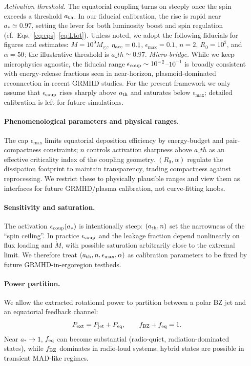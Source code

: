\documentclass[twocolumn]{aastex701}
\newcommand{\ath}{a_{\rm th}}
\newcommand{\rg}{r_g}
\newcommand{\LEdd}{L_{\rm Edd}}
\newcommand{\Ltot}{L_{\rm tot}}
\newcommand{\FeKa}{\mathrm{Fe\,K}\alpha}
\def\ath{a\_th}\def\rg{r\_g}\def\LEdd{L\_Edd}\def\Ltot{L\_tot}\def\FeKa{Fe K\string\alpha}%
\begin{document}
\noindent\textit{Activation threshold.}
The equatorial coupling turns on steeply once the spin exceeds a threshold \(a_{\rm th}\).
In our fiducial calibration, the rise is rapid near \(a_\ast \simeq 0.97\), setting the lever for both luminosity boost and spin regulation (cf.\ Eqs.~\eqref{eq:eps}--\eqref{eq:Ltot}).
\FloatBarrier
Unless noted, we adopt the following fiducials for figures and estimates: $M=10^9M_\odot$, $\eta_{\rm acc}=0.1$, $\epsilon_{\max}=0.1$, $n=2$, $R_0=10^2$, and $\alpha=50$; the illustrative threshold is $\ath\simeq0.97$.
\noindent\emph{Micro-bridge.}
While we keep microphysics agnostic, the fiducial range
$\epsilon_{\rm coup}\sim10^{-2}$–$10^{-1}$ is broadly consistent with
energy-release fractions seen in near-horizon, plasmoid-dominated
reconnection in recent GRMHD studies. For the present framework we only
assume that $\epsilon_{\rm coup}$ rises sharply above $a_{\rm th}$ and
saturates below $\epsilon_{\max}$; detailed calibration is left for
future simulations.

\paragraph{Phenomenological parameters and physical ranges.}
The cap $\epsilon_{\max}$ limits equatorial deposition efficiency by energy-budget and pair-compactness constraints; $n$ controls activation sharpness above $\ath$ as an effective criticality index of the coupling geometry. $(R_0,\alpha)$ regulate the dissipation footprint to maintain transparency, trading compactness against reprocessing. We restrict these to physically plausible ranges and view them as interfaces for future GRMHD/plasma calibration, not curve-fitting knobs.
\paragraph{Sensitivity and saturation.}
The activation $\epsilon_{\rm coup}(a_*)$ is intentionally steep: $(a_{\rm th},n)$ set the narrowness of the “spin ceiling”. In practice $\epsilon_{\rm coup}$ and the leakage fraction depend nonlinearly on flux loading and $\dot M$, with possible saturation arbitrarily close to the extremal limit. We therefore treat $(a_{\rm th},n,\epsilon_{\max},\alpha)$ as calibration parameters to be fixed by future GRMHD-in-ergoregion testbeds.


\paragraph{Power partition.}
We allow the extracted rotational power to partition between a polar BZ jet and an equatorial feedback channel:
\[
P_{\rm ext}=P_{\rm jet}+P_{\rm eq},\qquad f_{\rm BZ}+f_{\rm eq}=1.
\]
Near $a_*\!\to\!1$, $f_{\rm eq}$ can become substantial (radio-quiet, radiation-dominated states), while $f_{\rm BZ}$ dominates in radio-loud systems; hybrid states are possible in transient MAD-like regimes.
\end{document}
